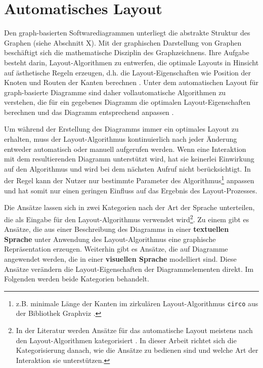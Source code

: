 
\section{Automatisches Layout}
\label{sec:automatic-layout}

Den graph-basierten Softwarediagrammen unterliegt die abstrakte Struktur des Graphen (siehe Abschnitt X). Mit der graphischen Darstellung von Graphen beschäftigt sich die mathematische Disziplin des Graphzeichnens. Ihre Aufgabe besteht darin, Layout-Algorithmen zu entwerfen, die optimale Layouts in Hinsicht auf ästhetische Regeln erzeugen, d.h. die Layout-Eigenschaften wie Position der Knoten und Routen der Kanten berechnen \cite{Eichelberger05Aesthetics, Arvo02Techniques, Siebenhaller03Automatisches, Maier12A-Pattern-based}. Unter dem automatischen Layout für graph-basierte Diagramme sind daher vollautomatische Algorithmen zu verstehen, die für ein gegebenes Diagramm die optimalen Layout-Eigenschaften berechnen und das Diagramm entsprechend anpassen \cite{Fuhrmann11On-the-Pragmatics}.

Um während der Erstellung des Diagramms immer ein optimales Layout zu erhalten, muss der Layout-Algorithmus kontinuierlich nach jeder Änderung entweder automatisch oder manuell aufgerufen werden. Wenn eine Interaktion mit dem resultierenden Diagramm unterstützt wird, hat sie keinerlei Einwirkung auf den Algorithmus und wird bei dem nächsten Aufruf nicht berücksichtigt. In der Regel kann der Nutzer nur bestimmte Parameter des Algorithmus\footnote{z.B. minimale Länge der Kanten im zirkulären Layout-Algorithmus \lstinline{circo} aus der Bibliothek Graphviz \cite{NorthGansner14Dot-Manual}.} anpassen und hat somit nur einen geringen Einfluss auf das Ergebnis des Layout-Prozesses.

Die Ansätze lassen sich in zwei Kategorien nach der Art der Sprache unterteilen, die als Eingabe für den Layout-Algorithmus verwendet wird\footnote{In der Literatur werden Ansätze für das automatische Layout meistens nach den Layout-Algorithmen kategorisiert \cite[S.39ff]{Fuhrmann11On-the-Pragmatics}. In dieser Arbeit richtet sich die Kategorisierung danach, wie die Ansätze zu bedienen sind und welche Art der Interaktion sie unterstützen.}. Zu einem gibt es Ansätze, die aus einer Beschreibung des Diagramms in einer \textbf{textuellen Sprache} unter Anwendung des Layout-Algorithmus eine graphische Repräsentation erzeugen. Weiterhin gibt es Ansätze, die auf Diagramme angewendet werden, die in einer \textbf{visuellen Sprache} modelliert sind. Diese Ansätze verändern die Layout-Eigenschaften der Diagrammelementen direkt. Im Folgenden werden beide Kategorien behandelt.

